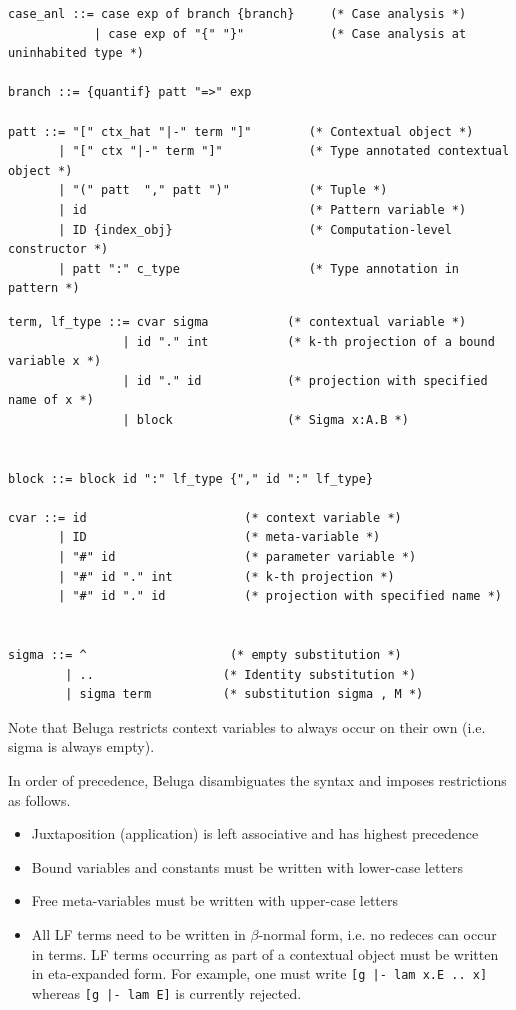 \documentclass[11pt]{article}
\begin{document}
\begin{verbatim}
case_anl ::= case exp of branch {branch}     (* Case analysis *)
            | case exp of "{" "}"            (* Case analysis at uninhabited type *)

branch ::= {quantif} patt "=>" exp

patt ::= "[" ctx_hat "|-" term "]"        (* Contextual object *)
       | "[" ctx "|-" term "]"            (* Type annotated contextual object *)
       | "(" patt  "," patt ")"           (* Tuple *)
       | id                               (* Pattern variable *)
       | ID {index_obj}                   (* Computation-level constructor *)
       | patt ":" c_type                  (* Type annotation in pattern *)
\end{verbatim}

\begin{verbatim}
term, lf_type ::= cvar sigma           (* contextual variable *)
                | id "." int           (* k-th projection of a bound variable x *)
                | id "." id            (* projection with specified name of x *)
                | block                (* Sigma x:A.B *)


block ::= block id ":" lf_type {"," id ":" lf_type}

cvar ::= id                      (* context variable *)
       | ID                      (* meta-variable *)
       | "#" id                  (* parameter variable *)
       | "#" id "." int          (* k-th projection *)
       | "#" id "." id           (* projection with specified name *)   


sigma ::= ^                    (* empty substitution *)
        | ..                  (* Identity substitution *)
        | sigma term          (* substitution sigma , M *)

\end{verbatim}
Note that Beluga restricts context variables to always occur on their own (i.e. sigma is always empty).

In order of precedence, Beluga disambiguates the syntax and imposes restrictions as follows.
\begin{itemize}
\item Juxtaposition (application) is left associative and has highest precedence
\item Bound variables and constants must be written with lower-case letters
\item Free meta-variables must be written with upper-case letters
\item All LF terms need to be written in $\beta$-normal form, i.e. no redeces can occur in terms. LF terms occurring as part of a contextual object must be written in eta-expanded form. For example, one must write \texttt{[g |- lam x.E .. x]} whereas \texttt{[g |- lam E]} is currently rejected.
\end{itemize}
\end{document}
